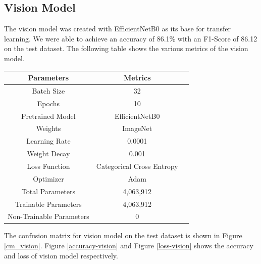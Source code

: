 \documentclass[fleqn, 10pt, twoside]{IOEGC}
\begin{document}
\subsection{Vision Model}
The vision model was created with EfficientNetB0 as its base for transfer learning. We were able to achieve an accuracy of 86.1\% with an F1-Score of 86.12 on the test dataset. The following table shows the various metrics of the vision model.
\begin{center}
	\begin{tabular}{ |c|c|c| }
		\hline
		\textbf{Parameters}      & \textbf{Metrics}          \\
		\hline
		Batch Size               & 32                        \\
		\hline
		Epochs                   & 10                        \\
		\hline
		Pretrained Model         & EfficientNetB0            \\
		\hline
		Weights                  & ImageNet                  \\
		\hline
		Learning Rate            & 0.0001                    \\
		\hline
		Weight Decay             & 0.001                     \\
		\hline
		Loss Function            & Categorical Cross Entropy \\
		\hline
		Optimizer                & Adam                      \\
		\hline
		Total Parameters         & 4,063,912                 \\
		\hline
		Trainable Parameters     & 4,063,912                 \\
		\hline
		Non-Trainable Parameters & 0                         \\
		\hline
	\end{tabular}
\end{center}

The confusion matrix for vision model on the test dataset is shown in Figure \ref{cm_vision}. Figure \ref{accuracy-vision} and Figure \ref{loss-vision} shows the accuracy and loss of vision model respectively.
\end{document}

